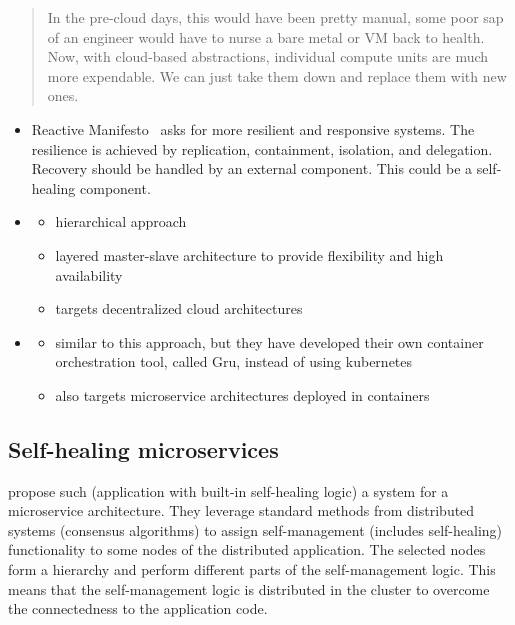   \begin{quote}
    In the pre-cloud days, this would have been pretty manual, some poor sap of an engineer would have to nurse a bare metal or VM back to health.
    Now, with cloud-based abstractions, individual compute units are much more expendable.
    We can just take them down and replace them with new ones.
  \end{quote}

  \begin{itemize}
    \item Reactive Manifesto~\cite{reactivemanifesto} asks for more resilient and responsive systems.
    The resilience is achieved by replication, containment, isolation, and delegation.
    Recovery should be handled by an external component.
    This could be a self-healing component.
    \item \cite{StackCloud}
      \begin{itemize}
        \item hierarchical approach
        \item layered master-slave architecture to provide flexibility and high availability
        \item targets decentralized cloud architectures
      \end{itemize}
    \item \cite{gru}
      \begin{itemize}
      \item similar to this approach, but they have developed their own container orchestration tool, called Gru, instead of using \gls{kubernetes}
      \item also targets microservice architectures deployed in containers
    \end{itemize}
  \end{itemize}

\subsection{Self-healing microservices}
  \citeauthor{ToffettiMicroservices} propose such (application with built-in self-healing logic) a system for a microservice architecture.
  They leverage standard methods from distributed systems (\ie consensus algorithms) to assign self-management (includes self-healing) functionality to some nodes of the distributed application.
  The selected nodes form a hierarchy and perform different parts of the self-management logic.
  This means that the self-management logic is distributed in the cluster to overcome the connectedness to the application code.

